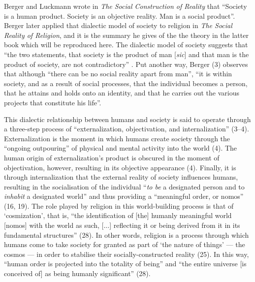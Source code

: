 \documentclass[Draft.tex]{subfiles}
\begin{document}
Berger and Luckmann \parencite*[79]{Berger67} wrote in
\textit{The Social Construction of Reality} that
``Society is a human product. Society is an objective reality.
Man is a social product''.
Berger later applied that dialectic model of society to religion
in \textit{The Social Reality of Religion},
and it is the summary he gives of the the theory
in the latter book which will be reproduced here.
The dialectic model of society suggests that
``the two statements, that society is the product of man
[\textit{sic}] and that
man is the product of society, are not contradictory''
\parencite[3]{Berger69}.
Put another way, Berger (3) observes that although
``there can be no social reality apart from man'',
``it is within society, and as a result of social processes,
that the individual becomes a person,
that he attains and holds onto an identity,
and that he carries out the various projects that constitute his life''.

This dialectic relationship between humans and society is said to operate
through a three-step process of
``externalization, objectivation, and internalization'' (3--4).
Externalization is the moment in which humans create society
through the ``ongoing outpouring'' of physical and mental activity
into the world (4).
The human origin of externalization's product is obscured
in the moment of objectivation, however,
resulting in its objective appearance (4).
Finally, it is through internalization that the external
reality of society influences humans, resulting in
the socialisation of the individual
``\textit{to be} a designated person
and to \textit{inhabit} a designated world''
and thus providing a ``meaningful order, or nomos'' (16, 19).
The role played by religion in this world-building process
is that of `cosmization', that is,
``the identification of [the] humanly meaningful world [nomos]
with the world as such, [...] reflecting it or being derived from it
in its fundamental structures'' (28).
In other words, religion is a process through which humans
come to take society for granted as part of `the nature of things'
--- the cosmos --- in order to stabilise their socially-constructed reality (25).
In this way, ``human order is projected into the totality of being''
and ``the entire universe [is conceived of] as being humanly significant'' (28).
\end{document}
